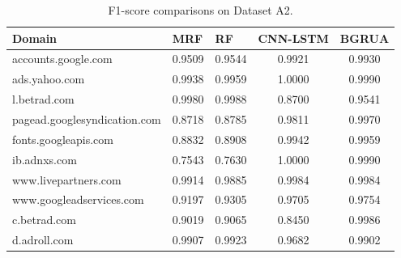 \documentclass[preprint,12pt]{elsarticle}
\begin{document}

\begin{table}[t]
\caption{F1-score comparisons on Dataset A2.}
\centering
\label{tab7}
\begin{tabular}{lllcc}
\hline
\textbf{Domain}              & \textbf{MRF}    & \textbf{RF}     & \textbf{CNN-LSTM} & \textbf{BGRUA}   \\ \hline
accounts.google.com          & 0.9509 & 0.9544 & 0.9921   & 0.9930 \\
ads.yahoo.com                & 0.9938 & 0.9959 & 1.0000   & 0.9990 \\
l.betrad.com                 & 0.9980 & 0.9988 & 0.8700   & 0.9541 \\
pagead.googlesyndication.com & 0.8718 & 0.8785 & 0.9811   & 0.9970 \\
fonts.googleapis.com         & 0.8832 & 0.8908 & 0.9942   & 0.9959 \\
ib.adnxs.com                 & 0.7543 & 0.7630 & 1.0000   & 0.9990 \\
www.livepartners.com         & 0.9914 & 0.9885 & 0.9984   & 0.9984 \\
www.googleadservices.com     & 0.9197 & 0.9305 & 0.9705   & 0.9754 \\
c.betrad.com                 & 0.9019 & 0.9065 & 0.8450   & 0.9986 \\
d.adroll.com                 & 0.9907 & 0.9923 & 0.9682   & 0.9902 \\ \hline
\end{tabular}
\end{table}




\end{document}
